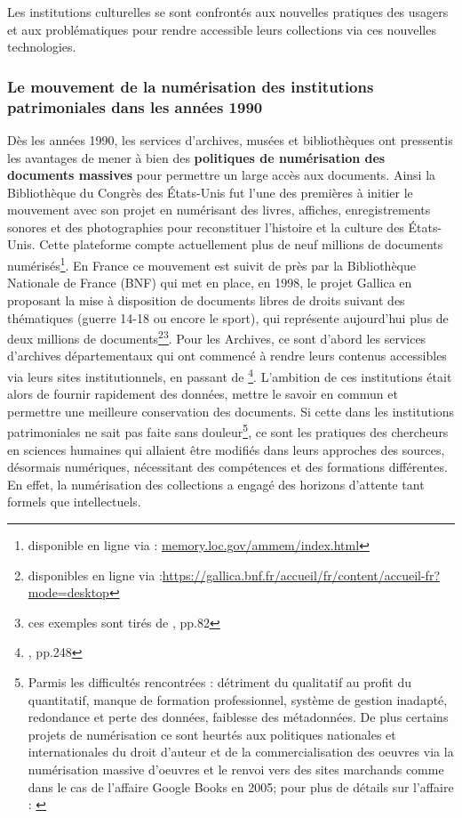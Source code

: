 Les institutions culturelles se sont confrontés aux nouvelles pratiques des usagers et aux problématiques pour rendre accessible leurs collections via ces nouvelles technologies. 

\subsubsection{Le mouvement de la numérisation des institutions patrimoniales dans les années 1990} 

Dès les années 1990, les services d'archives, musées et bibliothèques ont pressentis les avantages de mener à bien des \textbf{politiques de numérisation des documents massives} pour permettre un large accès aux documents. Ainsi la Bibliothèque du Congrès des États-Unis fut l'une des premières à initier le mouvement avec son projet  en numérisant des livres, affiches, enregistrements sonores et des photographies pour reconstituer l'histoire et la culture des États-Unis. Cette plateforme compte actuellement plus de neuf millions de documents numérisés\footnote{disponible en ligne via : \url{memory.loc.gov/ammem/index.html}}. En France ce mouvement est suivit de près par la Bibliothèque Nationale de France (BNF) qui met en place, en 1998, le projet Gallica en proposant la mise à disposition de documents libres de droits suivant des thématiques (guerre 14-18 ou encore le sport), qui représente aujourd'hui plus de deux millions de documents\footnote{disponibles en ligne via :\url{https://gallica.bnf.fr/accueil/fr/content/accueil-fr?mode=desktop}}\footnote{ces exemples sont tirés de \cite{gillet_introduction_2016}, pp.82}. 
Pour les Archives, ce sont d'abord les services d'archives départementaux qui ont commencé à rendre leurs contenus accessibles via leurs sites institutionnels, en passant de \footnote{\cite{limon-bonnet_innovation_2019}, pp.248}. L'ambition de ces institutions était alors de fournir rapidement des données, mettre le savoir en commun et permettre une meilleure conservation des documents.
Si cette  dans les institutions patrimoniales ne sait pas faite sans douleur\footnote{Parmis les difficultés rencontrées : détriment du qualitatif au profit du quantitatif, manque de formation professionnel, système de gestion inadapté, redondance et perte des données, faiblesse des métadonnées. De plus certains projets de numérisation ce sont heurtés aux politiques nationales et internationales du droit d'auteur et de la commercialisation des oeuvres via la numérisation massive d'oeuvres et le renvoi vers des sites marchands comme dans le cas de l'affaire Google Books en 2005; pour plus de détails sur l'affaire : \cite{jeanneney_quand_2010}}, ce sont les pratiques des chercheurs en sciences humaines qui allaient être modifiés dans leurs approches des sources, désormais numériques, nécessitant des compétences et des formations différentes. En effet, la numérisation des collections a engagé des horizons d’attente tant formels que intellectuels.

